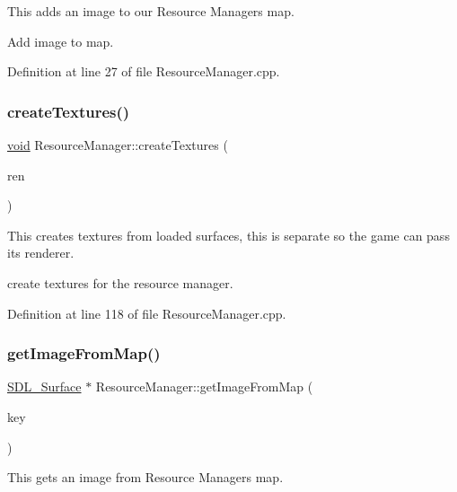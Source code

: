 This adds an image to our Resource Manager\textquotesingle{}s map. 

Add image to map. 

Definition at line 27 of file Resource\+Manager.\+cpp.

\mbox{\label{class_resource_manager_ad1cad583428596c69f9190acb291b02a}} 
\subsubsection{\texorpdfstring{createTextures()}{createTextures()}}
{\footnotesize\ttfamily \mbox{\hyperlink{_s_d_l__opengles2__gl2ext_8h_ae5d8fa23ad07c48bb609509eae494c95}{void}} Resource\+Manager\+::create\+Textures (\begin{DoxyParamCaption}\item[{\mbox{\hyperlink{_s_d_l__render_8h_aaf0bf7d020754fc614fe06552ea4d5d4}{S\+D\+L\+\_\+\+Renderer}} $\ast$}]{ren }\end{DoxyParamCaption})}



This creates textures from loaded surfaces, this is separate so the game can pass its renderer. 

create textures for the resource manager. 

Definition at line 118 of file Resource\+Manager.\+cpp.

\mbox{\label{class_resource_manager_aa4d2ecc550067337c2056d42dafca39a}} 
\subsubsection{\texorpdfstring{getImageFromMap()}{getImageFromMap()}}
{\footnotesize\ttfamily \mbox{\hyperlink{struct_s_d_l___surface}{S\+D\+L\+\_\+\+Surface}} $\ast$ Resource\+Manager\+::get\+Image\+From\+Map (\begin{DoxyParamCaption}\item[{int}]{key }\end{DoxyParamCaption})}



This gets an image from Resource Manager\textquotesingle{}s map. 

